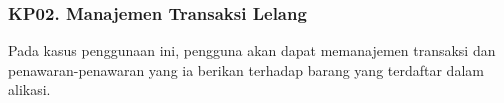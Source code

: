 \subsubsection{KP02. Manajemen Transaksi Lelang}
\label{kp02}

Pada kasus penggunaan ini, pengguna akan dapat memanajemen transaksi dan penawaran-penawaran yang ia berikan terhadap barang yang terdaftar dalam alikasi.\\

	
	
	
	
	
	
	